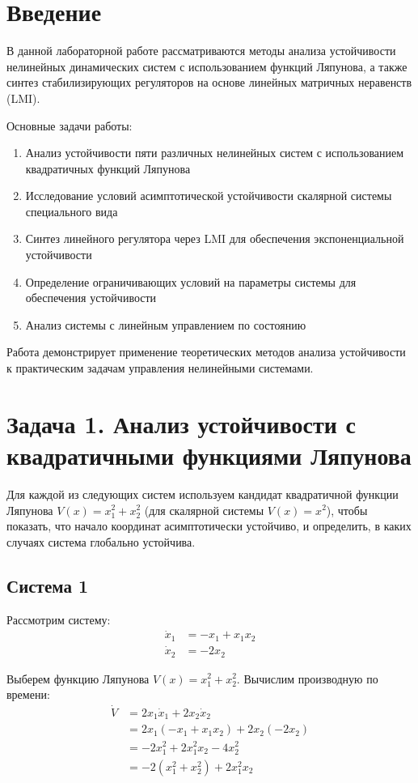 \section*{Введение}

В данной лабораторной работе рассматриваются методы анализа устойчивости нелинейных динамических систем с использованием функций Ляпунова, а также синтез стабилизирующих регуляторов на основе линейных матричных неравенств (LMI).

Основные задачи работы:
\begin{enumerate}
\item Анализ устойчивости пяти различных нелинейных систем с использованием квадратичных функций Ляпунова
\item Исследование условий асимптотической устойчивости скалярной системы специального вида
\item Синтез линейного регулятора через LMI для обеспечения экспоненциальной устойчивости
\item Определение ограничивающих условий на параметры системы для обеспечения устойчивости
\item Анализ системы с линейным управлением по состоянию
\end{enumerate}

Работа демонстрирует применение теоретических методов анализа устойчивости к практическим задачам управления нелинейными системами.

\section*{Задача 1. Анализ устойчивости с квадратичными функциями Ляпунова}

Для каждой из следующих систем используем кандидат квадратичной функции Ляпунова $V(x) = x_1^2 + x_2^2$ (для скалярной системы $V(x) = x^2$), чтобы показать, что начало координат асимптотически устойчиво, и определить, в каких случаях система глобально устойчива.

\subsection*{Система 1}

Рассмотрим систему:
\begin{align}
\dot{x}_1 &= -x_1 + x_1 x_2 \\
\dot{x}_2 &= -2x_2
\end{align}

Выберем функцию Ляпунова $V(x) = x_1^2 + x_2^2$. Вычислим производную по времени:
\begin{align}
\dot{V} &= 2x_1 \dot{x}_1 + 2x_2 \dot{x}_2 \\
&= 2x_1(-x_1 + x_1 x_2) + 2x_2(-2x_2) \\
&= -2x_1^2 + 2x_1^2 x_2 - 4x_2^2 \\
&= -2(x_1^2 + x_2^2) + 2x_1^2 x_2
\end{align}

